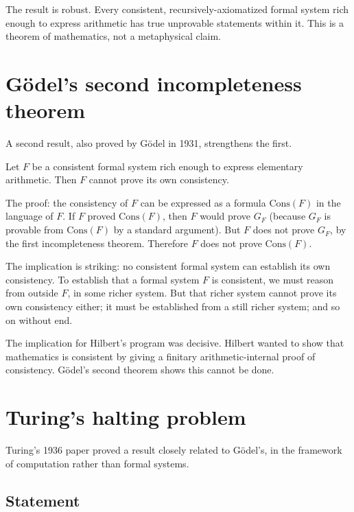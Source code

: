 The result is robust. Every consistent, recursively-axiomatized
formal system rich enough to express arithmetic has true
unprovable statements within it. This is a theorem of mathematics,
not a metaphysical claim.

\section{G\"odel's second incompleteness theorem}
\label{sec:godel-second}

A second result, also proved by G\"odel in 1931, strengthens the
first.

\begin{theorem}
\label{thm:godel-2}
Let $F$ be a consistent formal system rich enough to express
elementary arithmetic. Then $F$ cannot prove its own consistency.
\end{theorem}

The proof: the consistency of $F$ can be expressed as a formula
$\text{Cons}(F)$ in the language of $F$. If $F$ proved
$\text{Cons}(F)$, then $F$ would prove $G_F$ (because $G_F$ is
provable from $\text{Cons}(F)$ by a standard argument). But $F$
does not prove $G_F$, by the first incompleteness theorem.
Therefore $F$ does not prove $\text{Cons}(F)$.

The implication is striking: no consistent formal system can
establish its own consistency. To establish that a formal system $F$
is consistent, we must reason from outside $F$, in some richer
system. But that richer system cannot prove its own consistency
either; it must be established from a still richer system; and so
on without end.

The implication for Hilbert's program was decisive. Hilbert wanted
to show that mathematics is consistent by giving a finitary
arithmetic-internal proof of consistency. G\"odel's second theorem
shows this cannot be done.

\section{Turing's halting problem}
\label{sec:halting}

Turing's 1936 paper proved a result closely related to G\"odel's,
in the framework of computation rather than formal systems.

\subsection{Statement}

